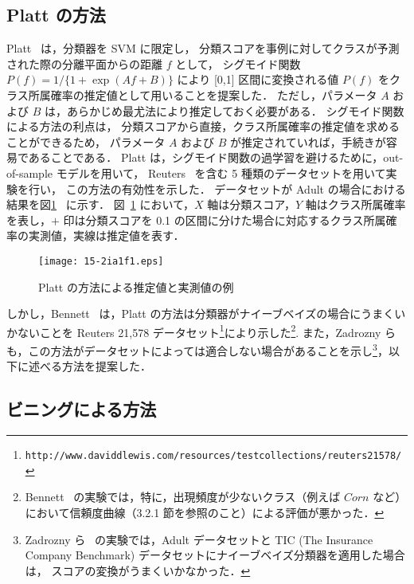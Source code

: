\documentclass[japanese]{jnlp_1.4}
\begin{document}
\subsection{Platt の方法}

Platt~\cite{Platt99} は，分類器を SVM に限定し，
分類スコアを事例に対してクラスが予測された際の分離平面からの距離 $f$ として，
シグモイド関数 $P( f ) = 1/\{1+\exp(Af+B)\}$ により [0,1] 区間に変換される値 $P (f)$ をクラス所属確率の推定値として用いることを提案した．
ただし，パラメータ $A$ および $B$ は，あらかじめ最尤法により推定しておく必要がある．
シグモイド関数による方法の利点は，
分類スコアから直接，クラス所属確率の推定値を求めることができるため，
パラメータ $A$ および $B$ が推定されていれば，手続きが容易であることである．
Platt は，シグモイド関数の過学習を避けるために，out-of-sample モデルを用いて，
Reuters~\cite{Joachims98} を含む 5 種類のデータセットを用いて実験を行い，
この方法の有効性を示した．
データセットが Adult の場合における結果を図\ref{Platt}~\cite{Platt99} に示す．
図~\ref{Platt} において，$X$ 軸は分類スコア，$Y$ 軸はクラス所属確率を表し，$+$ 印は分類スコアを 0.1 の区間に分けた場合に対応するクラス所属確率の実測値，実線は推定値を表す．


\begin{figure}[b]
  \begin{center}
\texttt{[image: 15-2ia1f1.eps]}
\caption{Platt の方法による推定値と実測値の例}
\label{Platt}
  \end{center}
\end{figure}


しかし，Bennett~\cite{Bennett00} は，Platt の方法は分類器がナイーブベイズの場合にうまくいかないことを Reuters 21,578 データセット\footnote{
	\texttt{http://www.daviddlewis.com/resources/testcollections/reuters21578/}
}により示した\footnote{
	Bennett~\cite{Bennett00} の実験では，特に，出現頻度が少ないクラス（例えば $Corn$ など）
	において信頼度曲線（3.2.1 節を参照のこと）による評価が悪かった．
}. 
また，Zadrozny ら~\cite{Zadrozny02} も，この方法がデータセットによっては適合しない場合があることを示し\footnote{
	Zadrozny ら~\cite{Zadrozny02} の実験では，Adult データセットと 
	TIC (The Insurance Company Benchmark) データセットにナイーブベイズ分類器を適用した場合は，
	スコアの変換がうまくいかなかった．
}，以下に述べる方法を提案した．

\subsection{ビニングによる方法}
\end{document}
